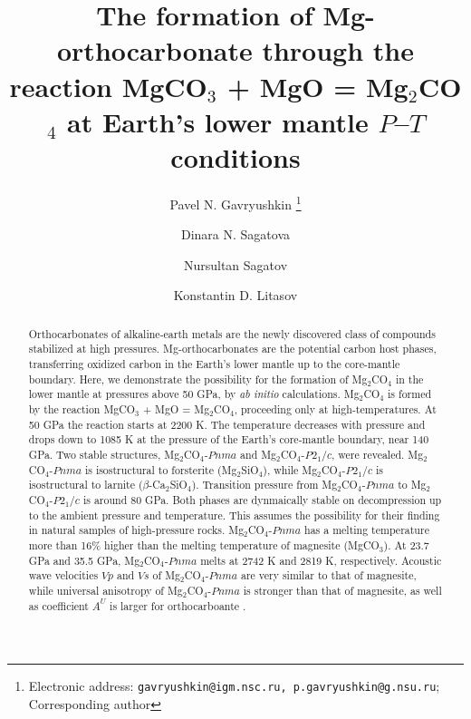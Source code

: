 \documentclass[a4paperm]{article}
\begin{document}

\title{The formation of Mg-orthocarbonate through the reaction MgCO$_3$ + MgO = Mg$_2$CO$_4$ at Earth's lower mantle $P$--$T$ conditions}


\author[1,2]{Pavel N. Gavryushkin
   \thanks{Electronic address: \texttt{gavryushkin@igm.nsc.ru, p.gavryushkin@g.nsu.ru}; Corresponding author}}     
\author[1,2]{Dinara N. Sagatova}
\author[1]{Nursultan Sagatov}
\author[3]{Konstantin D. Litasov}


\date{}
\maketitle


\begin{abstract}
Orthocarbonates of alkaline-earth metals are the newly discovered class of compounds stabilized at high pressures.
Mg-orthocarbonates are the potential carbon host phases, transferring oxidized carbon in the Earth's lower mantle up to the core-mantle boundary.
Here, we demonstrate the possibility for the formation of Mg$_2$CO$_4$ in the lower mantle at pressures above 50 GPa, by {\it ab initio} calculations.
Mg$_2$CO$_4$ is formed by the reaction MgCO$_3$ + MgO = Mg$_2$CO$_4$, proceeding only at high-temperatures.
At 50 GPa the reaction starts at 2200 K.
The temperature decreases with pressure and drops down to 1085 K at the pressure of the Earth's core-mantle boundary, near 140 GPa.
Two stable structures, Mg$_2$CO$_4$-$Pnma$ and Mg$_2$CO$_4$-$P2_1/c$, were revealed.
Mg$_2$CO$_4$-$Pnma$ is isostructural to forsterite (Mg$_2$SiO$_4$), while Mg$_2$CO$_4$-$P2_1/c$ is isostructural to larnite ($\beta$-Ca$_2$SiO$_4$).
Transition pressure from Mg$_2$CO$_4$-$Pnma$ to Mg$_2$CO$_4$-$P2_1/c$ is around 80 GPa.
Both phases are dynmaically stable on decompression up to the ambient pressure and temperature. 
This assumes the possibility for their finding in natural samples of high-pressure rocks.
Mg$_2$CO$_4$-$Pnma$ has a melting temperature more than 16\% higher  than the melting temperature of magnesite (MgCO$_3$).
At 23.7 GPa and 35.5 GPa, Mg$_2$CO$_4$-$Pnma$  melts at 2742 K and 2819 K, respectively.
Acoustic wave velocities $Vp$ and $Vs$ of Mg$_2$CO$_4$-$Pnma$ are very similar to that of magnesite, while universal anisotropy of Mg$_2$CO$_4$-$Pnma$ is stronger than that of magnesite, as well as coefficient $A^U$ is larger for orthocarboante .



\end{abstract}
\end{document}
